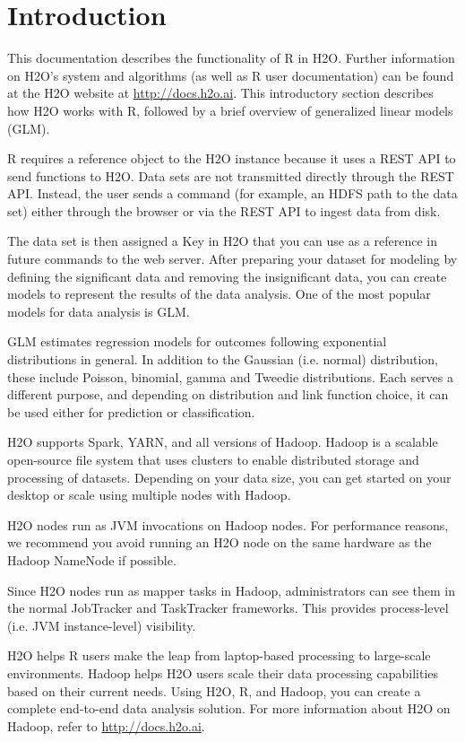 \section{Introduction}

This documentation describes the functionality of R in H2O. Further information on H2O's system and algorithms (as well as R user documentation) can be found at the H2O website at {\url{http://docs.h2o.ai}}. This introductory section describes how H2O works with R, followed by a brief overview of generalized linear models (GLM). 

R requires a reference object to the H2O instance because it uses a REST API to send functions to H2O. Data sets are not transmitted directly through the REST API. Instead, the user sends a command (for example, an HDFS path to the data set) either through the browser or via the REST API to ingest data from disk.

The data set is then assigned a Key in H2O that you can use as a reference in future commands to the web server. After preparing your dataset for modeling by defining the significant data and removing the insignificant data, you can create models to represent the results of the data analysis. One of the most popular models for data analysis is GLM. 

GLM estimates regression models for outcomes following exponential distributions in general. In addition to the Gaussian (i.e. normal) distribution, these include Poisson, binomial, gamma and Tweedie distributions. Each serves a different purpose, and depending on distribution and link function choice, it can be used either for prediction or classification.

H2O supports Spark, YARN, and all versions of Hadoop. Hadoop is a scalable open-source file system that uses clusters to enable distributed storage and processing of datasets. Depending on your data size, you can get started on your desktop or scale using multiple nodes with Hadoop. 

H2O nodes run as JVM invocations on Hadoop nodes. For performance reasons, we recommend you avoid running an H2O node on the same hardware as the Hadoop NameNode if possible.

Since H2O nodes run as mapper tasks in Hadoop, administrators can see them in the normal JobTracker and TaskTracker frameworks. This provides process-level (i.e. JVM instance-level) visibility.

H2O helps R users make the leap from laptop-based processing to large-scale environments. Hadoop helps H2O users scale their data processing capabilities based on their current needs. Using H2O, R, and Hadoop, you can create a complete end-to-end data analysis solution. For more information about H2O on Hadoop, refer to {\url{http://docs.h2o.ai}}.

